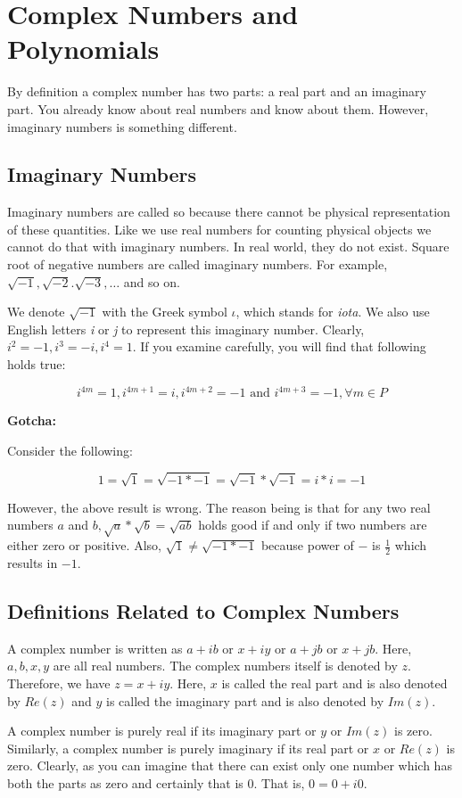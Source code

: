 \chapter{Complex Numbers and Polynomials}
By definition a complex number has two parts: a real part and an imaginary part. You already know about real numbers and know about
them. However, imaginary numbers is something different.
\section{Imaginary Numbers}
Imaginary numbers are called so because there cannot be physical representation of these quantities. Like we use real numbers for
counting physical objects we cannot do that with imaginary numbers. In real world, they do not exist. Square root of negative
numbers are called imaginary numbers. For example, $\sqrt{-1}, \sqrt{-2}. \sqrt{-3}, \ldots$ and so on.

We denote $\sqrt{-1}$ with the Greek symbol $\iota$, which stands for \textit{iota}. We also use English letters \textit{i} or
\textit{j} to represent this imaginary number. Clearly, $i^2 = -1, i^3 = -i, i^4 = 1$. If you examine carefully, you will find that
following holds true:

$$i^{4m} = 1, i^{4m + 1} = i, i^{4m + 2} = -1 \text{~and~} i^{4m +3} = -1, \forall m\in P$$

\dangersign \textbf{Gotcha:}

Consider the following:

$$1 = \sqrt{1} = \sqrt{-1*-1} = \sqrt{-1}*\sqrt{-1} = i*i = -1$$

However, the above result is wrong. The reason being is that for any two real numbers $a$ and $b, \sqrt{a}*\sqrt{b} = \sqrt{ab}$
holds good if and only if two numbers are either zero or positive. Also, $\sqrt{1}\neq \sqrt{-1*-1}$ because power of $-$ is
$\frac{1}{2}$ which results in $-1$.

\section{Definitions Related to Complex Numbers}
A complex number is written as $a + ib$ or $x + iy$ or $a + jb$ or $x + jb$. Here, $a, b, x, y$ are all real numbers. The complex
numbers itself is denoted by $z$. Therefore, we have $z = x + iy$. Here, $x$ is called the real part and is also denoted by $Re(z)$
and $y$ is called the imaginary part and is also denoted by $Im(z)$.

A complex number is purely real if its imaginary part or $y$ or $Im(z)$ is zero. Similarly, a complex number is purely imaginary if
its real part or $x$ or $Re(z)$ is zero. Clearly, as you can imagine that there can exist only one number which has both the parts
as zero and certainly that is $0$. That is, $0=0+i0$.

